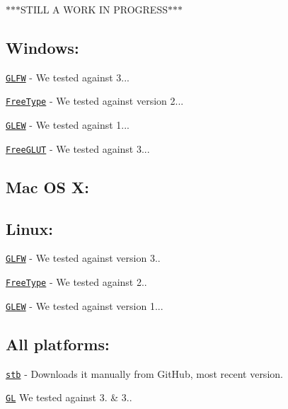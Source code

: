 $\ast$$\ast$$\ast$\+S\+T\+I\+L\+L A W\+O\+R\+K I\+N P\+R\+O\+G\+R\+E\+S\+S$\ast$$\ast$$\ast$

\subsection*{Windows\+:}

\href{https://github.com/glfw/glfw/releases/download/3.1.1/glfw-3.1.1.zip}{\tt G\+L\+F\+W} -\/ We tested against 3...

\href{http://downloads.sourceforge.net/project/gnuwin32/freetype/2.3.5-1/freetype-2.3.5-1-bin.zip}{\tt Free\+Type} -\/ We tested against version 2...

\href{http://downloads.sourceforge.net/project/glew/glew/1.12.0/glew-1.12.0.zip}{\tt G\+L\+E\+W} -\/ We tested against 1...

\href{http://downloads.sourceforge.net/project/freeglut/freeglut/3.0.0/freeglut-3.0.0.tar.gz}{\tt Free\+G\+L\+U\+T} -\/ We tested against 3... \subsection*{Mac O\+S X\+:}

\subsection*{Linux\+:}

\href{http://www.glfw.org/download.html}{\tt G\+L\+F\+W} -\/ We tested against version 3..

\href{http://www.freetype.org/download.html}{\tt Free\+Type} -\/ We tested against 2..

\href{http://glew.sourceforge.net/}{\tt G\+L\+E\+W} -\/ We tested against version 1...

\subsection*{All platforms\+:}

\href{https://github.com/nothings/stb/archive/master.zip}{\tt stb} -\/ Downloads it manually from Git\+Hub, most recent version.

\href{https://www.opengl.org/}{\tt G\+L} We tested against 3. \& 3.. 